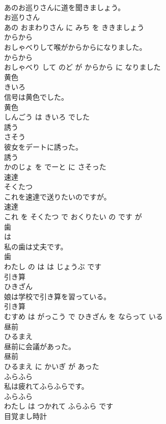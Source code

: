 \documentclass[8pt]{extreport}
\begin{document}
\begin{CJK}{UTF8}{min}
\\	あのお巡りさんに道を聞きましょう。	
\\	お巡りさん 
\\	あの おまわりさん に みち を ききましょう			
\\	からから	
\\	おしゃべりして喉がからからになりました。	
\\	からから 
\\	おしゃべり して のど が からから に なりました			
\\	黄色	
\\	きいろ			
\\	信号は黄色でした。	
\\	黄色 
\\	しんごう は きいろ でした			
\\	誘う	
\\	さそう			
\\	彼女をデートに誘った。	
\\	誘う 
\\	かのじょ を でーと に さそった			
\\	速達	
\\	そくたつ			
\\	これを速達で送りたいのですが。	
\\	速達 
\\	これ を そくたつ で おくりたい の です が			
\\	歯	
\\	は			
\\	私の歯は丈夫です。	
\\	歯 
\\	わたし の は は じょうぶ です			
\\	引き算	
\\	ひきざん			
\\	娘は学校で引き算を習っている。	
\\	引き算 
\\	むすめ は がっこう で ひきざん を ならって いる			
\\	昼前	
\\	ひるまえ			
\\	昼前に会議があった。	
\\	昼前 
\\	ひるまえ に かいぎ が あった			
\\	ふらふら	
\\	私は疲れてふらふらです。	
\\	ふらふら 
\\	わたし は つかれて ふらふら です			
\\	目覚まし時計	

\end{CJK}
\end{document}
